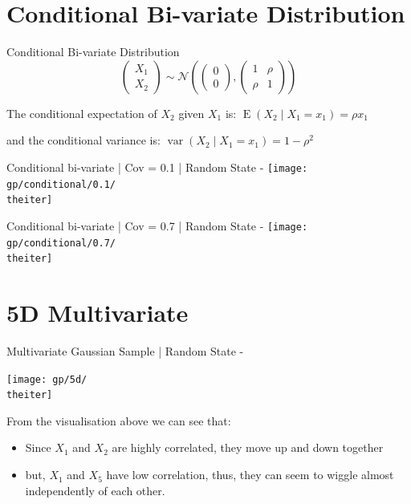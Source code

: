 \documentclass{beamer}
\begin{document}
\section{Conditional Bi-variate Distribution}

\begin{frame}{Conditional Bi-variate Distribution}
$$
\begin{pmatrix}
	X_1 \\
	X_2
\end{pmatrix}  \sim \mathcal{N} \left( \begin{pmatrix}
	0 \\
	0
\end{pmatrix} , \begin{pmatrix}
	1 & \rho \\
	\rho & 1
\end{pmatrix} \right)
$$

The conditional expectation of $X_2$ given $X_1$ is: $\operatorname{E}(X_2 \mid X_1=x_1)= \rho x_1$

and the conditional variance is: $\operatorname{var}(X_2 \mid X_1 = x_1) = 1-\rho^2$
\end{frame}

%
{%
	\begin{frame}{Conditional bi-variate | Cov = 0.1 | Random State - \theiter}
		\texttt{[image: gp/conditional/0.1/\\theiter]}
	\end{frame}
}

%
{%
	\begin{frame}{Conditional bi-variate | Cov = 0.7 | Random State - \theiter}
		\texttt{[image: gp/conditional/0.7/\\theiter]}
	\end{frame}
}

\section{5D Multivariate}

%
{%
	\begin{frame}{Multivariate Gaussian Sample | Random State - \theiter}
		\begin{center}
			\texttt{[image: gp/5d/\\theiter]}
		\end{center}
		From the visualisation above we can see that:
		\begin{itemize}
			\item Since $X_1$ and $X_2$ are highly correlated, they move up and down together
			\item but, $X_1$ and $X_5$ have low correlation, thus, they can seem to wiggle almost independently of each other.
		\end{itemize}
	\end{frame}
}
\end{document}
